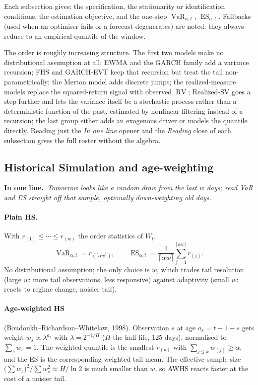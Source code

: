 \documentclass[11pt,a4paper]{article}
\newcommand{\VaR}{\operatorname{VaR}}
\newcommand{\ES}{\operatorname{ES}}
\newcommand{\RV}{\operatorname{RV}}
\newcommand{\inbrief}[1]{\par\noindent\textbf{In one line.}\ \textit{#1}\par\smallskip}
\begin{document}
Each subsection gives: the specification, the stationarity or identification
conditions, the estimation objective, and the one-step $\VaR_{\alpha,t}$,
$\ES_{\alpha,t}$. Fallbacks (used when an optimiser fails or a forecast
degenerates) are noted; they always reduce to an empirical quantile of the
window.

The order is roughly increasing structure. The first two models make no
distributional assumption at all; EWMA and the GARCH family add a variance
recursion; FHS and GARCH-EVT keep that recursion but treat the tail
non-parametrically; the Merton model adds discrete jumps; the realized-measure
models replace the squared-return signal with observed $\RV$; Realized-SV goes
a step further and lets the variance itself be a stochastic process rather
than a deterministic function of the past, estimated by nonlinear filtering
instead of a recursion; the last group either adds an exogenous driver or
models the quantile directly. Reading just the \emph{In one line} opener and
the \emph{Reading} close of each subsection gives the full roster without the
algebra.

\subsection{Historical Simulation and age-weighting}

\inbrief{Tomorrow looks like a random draw from the last $w$ days; read VaR and
ES straight off that sample, optionally down-weighting old days.}

\paragraph{Plain HS.} With $r_{(1)}\le\cdots\le r_{(w)}$ the order statistics of
$W_t$,
\begin{equation}
  \VaR_{\alpha,t} = r_{(\lceil \alpha w\rceil)},
  \qquad
  \ES_{\alpha,t} = \frac{1}{\lceil\alpha w\rceil}\sum_{j=1}^{\lceil\alpha w\rceil} r_{(j)} .
\end{equation}
No distributional assumption; the only choice is $w$, which trades tail
resolution (large $w$: more tail observations, less responsive) against
adaptivity (small $w$: reacts to regime change, noisier tail).

\paragraph{Age-weighted HS} (Boudoukh--Richardson--Whitelaw, 1998). Observation
$s$ at age $a_s = t-1-s$ gets weight $w_s \propto \lambda^{a_s}$ with
$\lambda = 2^{-1/H}$ ($H$ the half-life, $125$ days), normalised to
$\sum_s w_s = 1$. The weighted quantile is the smallest $r_{(k)}$ with
$\sum_{j\le k} w_{(j)} \ge \alpha$, and the ES is the corresponding weighted tail
mean. The effective sample size $\big(\sum w_s\big)^2/\sum w_s^2 \approx H/\ln 2$
is much smaller than $w$, so AWHS reacts faster at the cost of a noisier tail.
\end{document}
